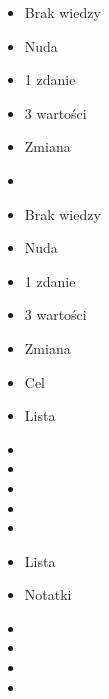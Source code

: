 \documentclass{beamer}
\begin{document}
\begin{frame}{}
	\begin{Large}
		\begin{itemize}
			\item Brak wiedzy
			\item Nuda
			\item 1 zdanie
			\item 3 wartości
			\item Zmiana
			\item 
		\end{itemize}
	\end{Large}
\end{frame}

\begin{frame}{}
	\begin{Large}
		\begin{itemize}
			\item Brak wiedzy
			\item Nuda
			\item 1 zdanie
			\item 3 wartości
			\item Zmiana
			\item Cel
		\end{itemize}
	\end{Large}
\end{frame}

\begin{frame}{}
	\begin{Large}
		\begin{itemize}
			\item Lista
			\item 
			\item 
			\item 
			\item 
			\item 
		\end{itemize}
	\end{Large}
\end{frame}

\begin{frame}{}
	\begin{Large}
		\begin{itemize}
			\item Lista
			\item Notatki
			\item 
			\item 
			\item 
			\item 
		\end{itemize}
	\end{Large}
\end{frame}
\end{document}
